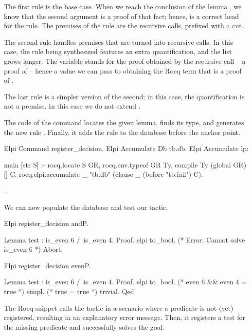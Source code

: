\documentclass{these-ISSS}
\newenvironment{rocqcode}
  {\VerbatimEnvironment\begin{rocqbox}\begin{xrocqcode}}{\end{xrocqcode}
\end{rocqbox}}
\begin{document}
The first rule is the base case. When we reach the conclusion of the lemma
, we know that the second argument  is a proof
of that fact; hence,  is a correct head for the rule. The
premises of the rule are the  recursive calls, prefixed with a cut.


The second rule handles premises that are turned into recursive calls. In this
case, the rule being synthesized features an extra  quantification,
and the  list grows longer.
The  variable stands for the proof
obtained by the recursive call -- a proof of  -- hence
a value we can pass to  obtaining the Rocq term
 that is a proof of .


The last rule is a simpler version of the second; in this case, the
quantification is not a premise. In this case we do not extend .


The code of the  command locates the given lemma,
finds its type, and generates the new rule . Finally, it adds the rule
to the database before the  anchor point.

\begin{rocqcode}
Elpi Command register_decision.
Elpi Accumulate Db tb.db.
Elpi Accumulate lp:{{
    
main [str S] :-
  rocq.locate S GR,
  rocq.env.typeof GR Ty,
  compile Ty (global GR) [] C,
  rocq.elpi.accumulate _ "tb.db" (clause _ (before "tb:fail") C).

}}.
\end{rocqcode}


We can now populate the database and test our tactic.

\begin{rocqcode}
Elpi register_decision andP.

Lemma test : is_even 6 /\ is_even 4.
Proof.
elpi to_bool. (* Error: Cannot solve is_even 6 *)
Abort.

Elpi register_decision evenP.

Lemma test : is_even 6 /\ is_even 4.
Proof.
elpi to_bool. (* even 6 && even 4 = true *)
simpl.        (* true = true *)
trivial.
Qed.
\end{rocqcode}
  

The Rocq snippet calls the  tactic in a scenario where a
predicate is not (yet) registered, resulting in an explanatory error message.
Then, it registers a test for the missing predicate and successfully solves
the goal.
\end{document}
